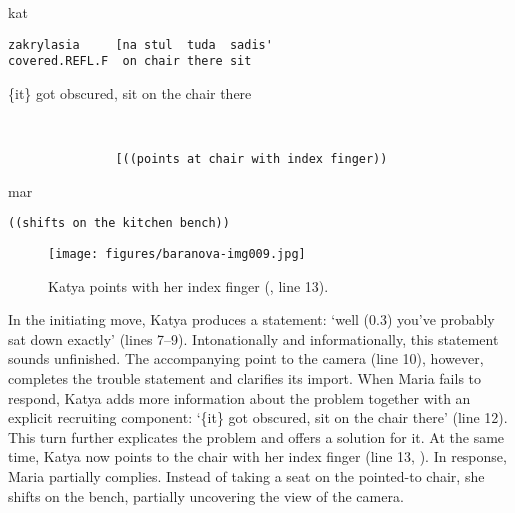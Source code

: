 \documentclass[output=paper,modfonts,nonflat]{langsci/langscibook}
\begin{document}
%
%
\begin{mdframednoverticalspace}[style=firstfoc]
\begin{transbox}{12}{kat}
\begin{verbatim}
zakrylasia     [na stul  tuda  sadis'
covered.REFL.F  on chair there sit
\end{verbatim}
\{it\} got obscured, sit on the chair there
\end{transbox}
\end{mdframednoverticalspace}
%
\begin{mdframednoverticalspace}[style=firstfoc]
\begin{transbox}{13}{~}
\begin{verbatim}
               [((points at chair with index finger))
\end{verbatim}
\end{transbox}
\end{mdframednoverticalspace}
%
%
\begin{mdframednoverticalspace}[style=secondfoc]
\begin{transbox}{15}{mar}
\begin{verbatim}
((shifts on the kitchen bench))
\end{verbatim}
\end{transbox}
\end{mdframednoverticalspace}

\begin{figure}
\caption{Katya points with her index finger (, line 13).}
\label{fig:baranova:9}
\texttt{[image: figures/baranova-img009.jpg]}
\end{figure}

In the initiating move, Katya produces a statement: ‘well (0.3) you’ve probably sat down exactly’ (lines 7--9). Intonationally and informationally, this statement sounds unfinished. The accompanying point to the camera (line 10), however, completes the trouble statement and clarifies its import. When Maria fails to respond, Katya adds more information about the problem together with an explicit recruiting component: ‘\{it\} got obscured, sit on the chair there’ (line 12). This turn further explicates the problem and offers a solution for it. At the same time, Katya now points to the chair with her index finger (line 13, ). In response, Maria partially complies. Instead of taking a seat on the pointed-to chair, she shifts on the bench, partially uncovering the view of the camera.
\end{document}

